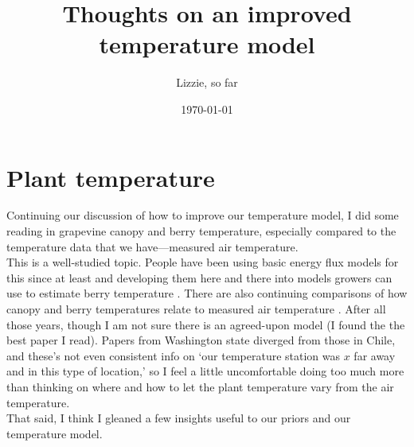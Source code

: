 \documentclass[11pt,letter]{article}
\begin{document}
\title{Thoughts on an improved temperature model}
\author{Lizzie, so far}
\date{\today}
\maketitle
\tableofcontents

\newpage
\section{Plant temperature}

Continuing our discussion of how to improve our temperature model, I did some reading in grapevine canopy and berry temperature, especially compared to the temperature data that we have---measured air temperature. \\

This is a well-studied topic. People have been using basic energy flux models for this since at least \citet{millar1972} and developing them here and there into models growers can use to estimate berry temperature \citep[e.g.,][]{cola2009}. There are also continuing comparisons of how canopy and berry temperatures relate to measured air temperature \citep[e.g.,][]{costa2019,pena2020}. After all those years, though I am not sure there is an agreed-upon model (I found the \citet{millar1972} the best paper I read). Papers from Washington state diverged from those in Chile, and these's not even consistent info on `our temperature station was $x$ far away and in this type of location,' so I feel a little uncomfortable doing too much more than thinking on where and how to let the plant temperature vary from the air temperature. \\

That said, I think I gleaned a few insights useful to our priors and our temperature model. 
\end{document}
